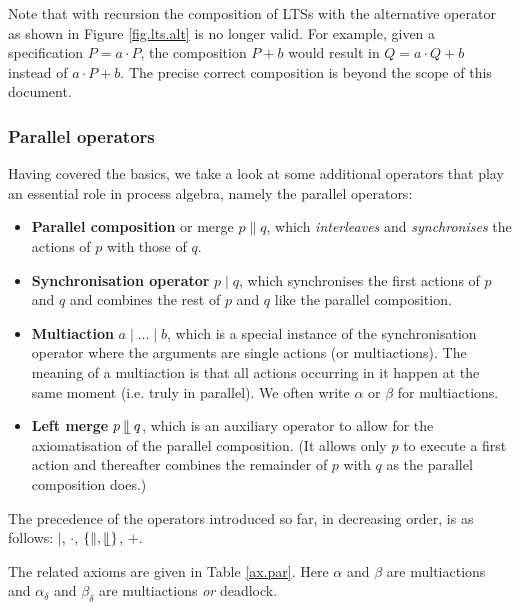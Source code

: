 \documentclass[a4paper,fleqn]{article}
\newcommand{\deffont}[1]{\textbf{#1}}
\newcommand{\seq}{\mathbin{\cdot}}
\newcommand{\alt}{\mathbin{+}}
\newcommand{\pmerge}{\mathbin{\parallel}}
\newcommand{\lmerge}{\mathbin{\llfloor}}
\newcommand{\sync}{\mathbin{\!\mid\!}}
\begin{document}
\noindent Note that with recursion the composition of LTSs with the alternative
operator as shown in Figure \ref{fig.lts.alt} is no longer valid. For example,
given a specification $P=a\seq P$, the composition $P\alt b$ would result in
$Q=a\seq Q\alt b$ instead of $a\seq P\alt b$. The precise correct composition
is beyond the scope of this document.

\subsubsection{Parallel operators}
\label{sssec:parallel operators}

Having covered the basics, we take a look at some additional operators
that play an essential role in process algebra, namely the parallel operators:

\begin{itemize}
\item \deffont{Parallel composition} or merge $p \pmerge q$, which {\it
interleaves} and {\it synchronises} the actions of $p$ with those of $q$.

\item \deffont{Synchronisation operator} $p \sync q$, which synchronises the
first actions of $p$ and $q$ and combines the rest of $p$ and $q$ like the
parallel composition.

\item \deffont{Multiaction} $a \sync \ldots \sync b$, which is a special
instance of the synchronisation operator where the arguments are single
actions (or multiactions). The meaning of a multiaction is that all actions
occurring in it happen at the same moment (i.e. truly in parallel). We often
write $\alpha$ or $\beta$ for multiactions.

\item \deffont{Left merge} $p \lmerge q$, which is an auxiliary operator to
allow for the axiomatisation of the parallel composition. (It allows only $p$
to execute a first action and thereafter combines the remainder of $p$ with $q$
as the parallel composition does.)

\end{itemize}

\noindent
The precedence of the operators introduced so far, in decreasing order,
is as follows:  $\mid$, $\seq$, $\{\pmerge,\lmerge\}$, $\alt$.

The related axioms are given in Table \ref{ax.par}. Here $\alpha$ and
$\beta$ are multiactions and $\alpha_\delta$ and $\beta_\delta$ are
multiactions {\it or} deadlock.
\end{document}
